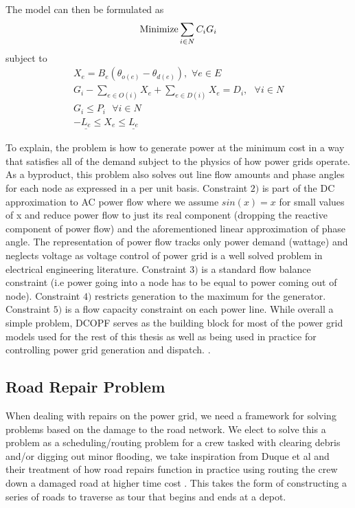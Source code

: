 \documentclass{article}
\begin{document}
	The model can then be formulated as 
	\begin{equation}
\textnormal{Minimize} \sum_{i\in N} C_i G_i
	\end{equation} 
	subject to
	\begin{eqnarray}
	X_e = B_e (\theta_{o(e)} - \theta_{d(e)}), \hspace{4pt} \forall e \in E\\
	G_i - \sum_{e \in O(i)} X_e + \sum_{e \in D(i)} X_e = D_i, \hspace{4pt} \hspace{4pt} \forall i \in N\\
	  G_i \leq P_{i} \hspace{4pt} \hspace{4pt} \forall i \in N	\\ 
	  -\underline{L_e} \leq X_e \leq \underline{L_e}
\end{eqnarray}

To explain, the problem is how to generate power at the minimum cost in a way that satisfies all of the demand subject to the physics of how power grids operate. As a byproduct, this problem also solves out line flow amounts and phase angles for each node as expressed in a per unit basis. Constraint $2)$ is part of the DC approximation to AC power flow where we assume $sin(x) = x$ for small values of x and reduce power flow to just its real component (dropping the reactive component of power flow) and the aforementioned linear approximation of phase angle. The representation of power flow tracks only power demand (wattage) and neglects voltage as voltage control of power grid is a well solved problem in electrical engineering literature. Constraint $3)$ is a standard flow balance constraint (i.e power going into a node has to be equal to power coming out of node). Constraint $4)$ restricts generation to the maximum for the generator. Constraint $5)$ is a flow capacity constraint on each power line. While overall a simple problem, DCOPF serves as the building block for most of the power grid models used for the rest of this thesis as well as being used in practice for controlling power grid generation and dispatch. \cite{LiBo2007}. 
	
	
	\subsection{Road Repair Problem}
	When dealing with repairs on the power grid, we need a framework for solving problems based on the damage to the road network. We elect to solve this a problem as a scheduling/routing problem for a crew tasked with clearing debris and/or digging out minor flooding, we take inspiration from Duque et al \cite{DuqueEA2016} and their treatment of how road repairs function in practice using routing the crew down a damaged road at higher time cost . This takes the form of constructing a series of roads to traverse as tour that begins and ends at a depot.
	
\end{document}
